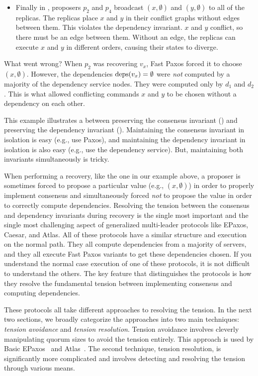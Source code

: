 \begin{itemize}
  \item
    Finally in , proposers $p_2$ and $p_4$ broadcast $(x,
    \emptyset)$ and $(y, \emptyset)$ to all of the replicas. The replicas place
    $x$ and $y$ in their conflict graphs without edges between them. This
    violates the dependency invariant. $x$ and $y$ conflict, so there must be
    an edge between them. Without an edge, the replicas can execute $x$ and $y$
    in different orders, causing their states to diverge.
\end{itemize}

What went wrong? When $p_2$ was recovering $v_x$, Fast Paxos forced it to
choose $(x, \emptyset{})$. However, the dependencies $\text{deps}(v_x) = \emptyset{}$
were \emph{not} computed by a majority of the dependency service nodes. They
were computed only by $d_1$ and $d_2$. This is what allowed conflicting
commands $x$ and $y$ to be chosen without a dependency on each other.

This example illustrates a  between preserving
the consensus invariant () and preserving the
dependency invariant (). Maintaining the consensus
invariant in isolation is easy (e.g., use Paxos), and maintaining the
dependency invariant in isolation is also easy (e.g., use the dependency
service). But, maintaining both invariants simultaneously is tricky.

When performing a recovery, like the one in our example above, a proposer is
sometimes forced to propose a particular value (e.g., $(x, \emptyset{})$) in
order to properly implement consensus and simultaneously forced \emph{not} to
propose the value in order to correctly compute dependencies.
%
Resolving the tension between the consensus and dependency invariants during
recovery is the single most important and the single most challenging aspect of
generalized multi-leader protocols like EPaxos, Caesar, and Atlas. All of these
protocols have a similar structure and execution on the normal path. They all
compute dependencies from a majority of servers, and they all execute Fast
Paxos variants to get these dependencies chosen. If you understand the normal
case execution of one of these protocols, it is not difficult to understand the
others. The key feature that distinguishes the protocols is how they resolve
the fundamental tension between implementing consensus and computing
dependencies.

These protocols all take different approaches to resolving the tension. In the
next two sections, we broadly categorize the approaches into two main
techniques: \emph{tension avoidance} and \emph{tension resolution}.  Tension
avoidance involves cleverly manipulating quorum sizes to avoid the tension
entirely. This approach is used by Basic EPaxos~\cite{moraru2013proof} and
Atlas~\cite{enes2020state}. The second technique, tension resolution, is
significantly more complicated and involves detecting and resolving the tension
through various means.
